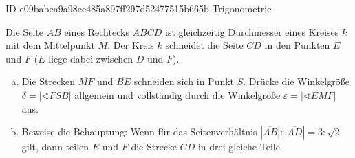 \begin{exercise}
      {ID-e09babea9a98ee485a897ff297d52477515b665b}
      {Trigonometrie}
  \ifproblem\problem\par
    Die Seite $\overline{AB}$ eines Rechtecks
    $ABCD$ ist gleichzeitig Durchmesser eines
    Kreises $k$ mit dem Mittelpunkt $M$. Der
    Kreis $k$ schneidet die Seite $\overline{CD}$
    in den Punkten $E$ und $F$ ($E$ liege dabei
    zwischen $D$ und $F$).
    \begin{enumerate}[a)]
      \item Die Strecken $\overline{MF}$ und
            $\overline{BE}$ schneiden sich in Punkt
            $S$. Drücke die Winkelgröße
            $\delta=\left|\sphericalangle FSB\right|$
            allgemein und vollständig durch die
            Winkelgröße
            $\varepsilon=\left|\sphericalangle EMF\right|$
            aus.
      \item Beweise die Behauptung: Wenn für das
            Seitenverhältnis
            $|\overline{AB}|:|\overline{AD}|=3:\sqrt{2}$
            gilt, dann teilen $E$ und $F$ die Strecke
            $\overline{CD}$ in drei gleiche Teile.
    \end{enumerate}
    \begin{center}
\end{center}
\end{exercise}
